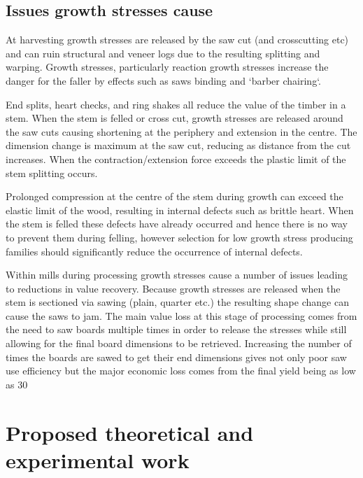 \documentclass{article}
\begin{document}
\subsection{Issues growth stresses cause }

At harvesting growth stresses are released by the saw cut (and crosscutting etc)
and can ruin structural and veneer logs due to the resulting splitting and
warping. Growth stresses, particularly reaction growth stresses increase the
danger for the faller by effects such as saws binding and `barber chairing`.

End splits, heart checks, and ring shakes all reduce the value of the timber in
a stem. When the stem is felled or cross cut, growth stresses are released
around the saw cuts causing shortening at the periphery and extension in the
centre. The dimension change is maximum at the saw cut, reducing as distance
from the cut increases. When the contraction/extension force exceeds the plastic
limit of the stem splitting occurs.

Prolonged compression at the centre of the stem during growth can exceed the
elastic limit of the wood, resulting in internal defects such as brittle heart.
When the stem is felled these defects have already occurred and hence there is
no way to prevent them during felling, however selection for low growth stress
producing families should significantly reduce the occurrence of internal
defects.

Within mills during processing growth stresses cause a number of issues leading
to reductions in value recovery. Because growth stresses are released when the
stem is sectioned via sawing (plain, quarter etc.) the resulting shape change
can cause the saws to jam. The main value loss at this stage of processing comes
from the need to saw boards multiple times in order to release the stresses
while still allowing for the final board dimensions to be retrieved.
Increasing the number of times the boards are sawed to get their end dimensions
gives not only poor saw use efficiency but the major economic loss comes from the
final yield being as low as 30%


\section{Proposed theoretical and experimental work}
\end{document}
